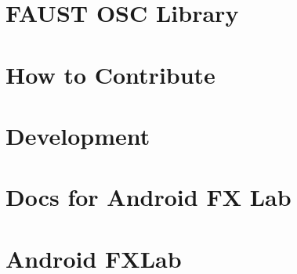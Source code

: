 \let\mypdfximage\pdfximage\def\pdfximage{\immediate\mypdfximage}\documentclass[twoside]{book}
\newcommand{\+}{\discretionary{\mbox{\scriptsize$\hookleftarrow$}}{}{}}
\begin{document}
\chapter{F\+A\+U\+ST O\+SC Library}
\label{md__c_1__users_fab_src__github_branches__neural_amp_modeler_plugin_i_plug2__dependencies__build_b6ba9443d742b2e8421746db3fe59c3a}

\chapter{How to Contribute}
\label{md__c_1__users_fab_src__github_branches__neural_amp_modeler_plugin_i_plug2__dependencies__build_bcf98f599e0e723cb9c53022a7014616}

\chapter{Development}
\label{md__c_1__users_fab_src__github_branches__neural_amp_modeler_plugin_i_plug2__dependencies__build_39865b329aee9cb41feb847eebe7a521}

\chapter{Docs for Android FX Lab}
\label{md__c_1__users_fab_src__github_branches__neural_amp_modeler_plugin_i_plug2__dependencies__build_cf49cc0878f7cbeb9183ca78ec4fade8}

\chapter{Android F\+X\+Lab}
\label{md__c_1__users_fab_src__github_branches__neural_amp_modeler_plugin_i_plug2__dependencies__build_36cb28d61c7ec7d038bce9c4891b03b8}

\end{document}
